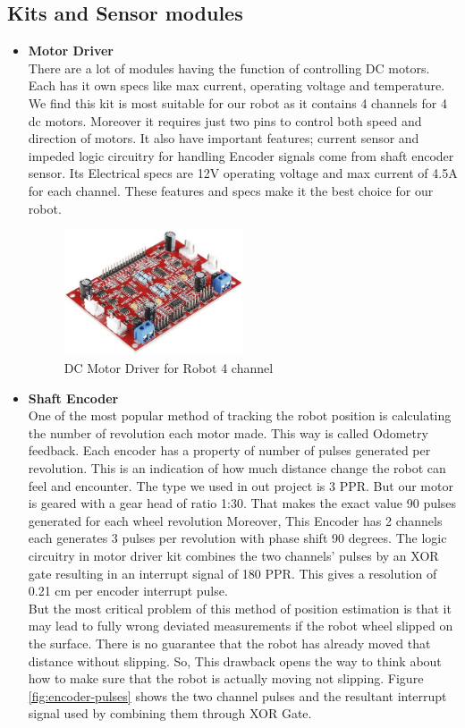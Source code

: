 \documentclass[12pt]{book}
\begin{document}
\subsection{Kits and Sensor modules}
\begin{itemize}
	\item \textbf{Motor Driver}\\
	There are a lot of modules having the function of controlling DC motors. Each has it own specs like max current, operating voltage and temperature. We find this kit is most suitable for our robot as it contains 4 channels for 4 dc motors. Moreover it requires just two pins to control both speed and direction of motors. It also have important features; current sensor and impeded logic circuitry for handling Encoder signals come from shaft encoder sensor.
	Its Electrical specs are 12V operating voltage and max current of 4.5A for each channel. These features and specs make it the best choice for our robot.
	
	
	\begin{figure}
		\centering
		\includegraphics[width =0.5\textwidth]{Fig/Electronics/motor-driver.jpg}
		\caption{DC Motor Driver for Robot 4 channel}
		\label{fig:motor-driver}
	\end{figure}

	\item \textbf{Shaft Encoder}\\
	One of the most popular method of tracking the robot position is calculating the number of revolution each motor made. This way is called Odometry feedback. Each encoder has a property of number of pulses generated per revolution. This is an indication of how much distance change the robot can feel and encounter. The type we used in out project is 3 PPR. But our motor is geared with a gear head of ratio 1:30. That makes the exact value 90 pulses generated for each wheel revolution  Moreover, This Encoder has 2 channels each generates 3 pulses per revolution with phase shift 90 degrees. The logic circuitry in motor driver kit combines the two channels' pulses by an XOR gate resulting in an interrupt signal of 180 PPR. This gives a resolution of 0.21 cm per encoder interrupt pulse.\\ 
	But the most critical problem of this method of position estimation is that it may lead to fully wrong deviated measurements if the robot wheel slipped on the surface. There is no guarantee that the robot has already moved that distance without slipping. So, This drawback opens the way to think about how to make sure that the robot is actually moving not slipping.
	Figure \ref{fig:encoder-pulses} shows the two channel pulses and the resultant interrupt signal used by combining them through XOR Gate.\\
	

\end{itemize}
\end{document}
